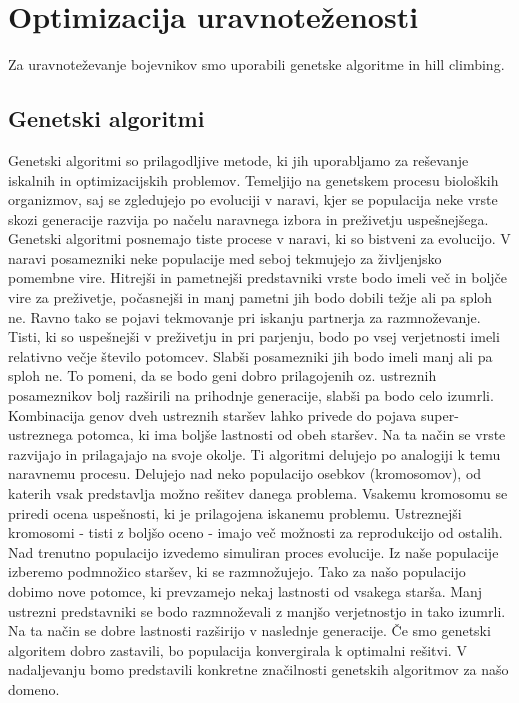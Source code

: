 \documentclass[12pt,a4paper,openany]{book}
\begin{document}
\section{Optimizacija uravnoteženosti}
Za uravnoteževanje bojevnikov smo uporabili genetske algoritme in hill climbing.

\subsection{Genetski algoritmi}
Genetski algoritmi so prilagodljive metode, ki jih uporabljamo za reševanje iskalnih in optimizacijskih problemov. Temeljijo na genetskem procesu bioloških organizmov, saj se zgledujejo po evoluciji v naravi, kjer se populacija neke vrste skozi generacije razvija po načelu naravnega izbora in preživetju uspešnejšega. Genetski algoritmi posnemajo tiste procese v naravi, ki so bistveni za evolucijo. V naravi posamezniki neke populacije med seboj tekmujejo za življenjsko pomembne vire. Hitrejši in pametnejši predstavniki vrste bodo imeli več in boljče vire za preživetje, počasnejši in manj pametni jih bodo dobili težje ali pa sploh ne. Ravno tako se pojavi tekmovanje pri iskanju partnerja za razmnoževanje. Tisti, ki so uspešnejši v preživetju in pri parjenju, bodo po vsej verjetnosti imeli relativno večje število potomcev. Slabši posamezniki jih bodo imeli manj ali pa sploh ne. To pomeni, da se bodo geni dobro prilagojenih oz. ustreznih posameznikov bolj razširili na prihodnje generacije, slabši pa bodo celo izumrli. Kombinacija genov dveh ustreznih staršev
lahko privede do pojava super-ustreznega potomca, ki ima boljše lastnosti od obeh staršev. Na ta način se vrste razvijajo in prilagajajo na svoje okolje.
Ti algoritmi delujejo po analogiji k temu naravnemu procesu. Delujejo nad neko populacijo osebkov (kromosomov), od katerih vsak predstavlja možno rešitev danega problema. Vsakemu kromosomu se priredi ocena uspešnosti, ki je prilagojena iskanemu problemu. Ustreznejši kromosomi - tisti z boljšo oceno - imajo več možnosti za reprodukcijo od ostalih. Nad trenutno populacijo izvedemo simuliran proces evolucije. Iz naše populacije izberemo podmnožico staršev, ki se razmnožujejo. Tako za našo populacijo dobimo nove potomce, ki prevzamejo nekaj lastnosti od vsakega starša. Manj ustrezni predstavniki se bodo razmnoževali z manjšo verjetnostjo in tako izumrli. Na ta način se dobre lastnosti razširijo v naslednje generacije. Če smo genetski algoritem dobro zastavili, bo populacija konvergirala k optimalni rešitvi.
V nadaljevanju bomo predstavili konkretne značilnosti genetskih algoritmov za našo domeno.
\end{document}

